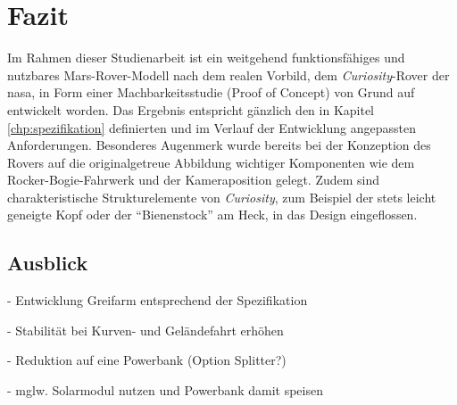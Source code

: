 \chapter{Fazit}
\label{chp:fazit}

Im Rahmen dieser Studienarbeit ist ein weitgehend funktionsfähiges und nutzbares Mars-Rover-Modell nach dem realen Vorbild, dem \textit{Curiosity}-Rover der \acs{nasa}, in Form einer Machbarkeitsstudie (Proof of Concept) von Grund auf entwickelt worden.
Das Ergebnis entspricht gänzlich den in Kapitel \ref{chp:spezifikation} definierten und im Verlauf der Entwicklung angepassten Anforderungen.
Besonderes Augenmerk wurde bereits bei der Konzeption des Rovers auf die originalgetreue Abbildung wichtiger Komponenten wie dem Rocker-Bogie-Fahrwerk und der Kameraposition gelegt.
Zudem sind charakteristische Strukturelemente von \textit{Curiosity}, zum Beispiel der stets leicht geneigte Kopf oder der \enquote{Bienenstock} am Heck, in das Design eingeflossen.


\section{Ausblick}
\label{sec:ausblick}

- Entwicklung Greifarm entsprechend der Spezifikation

- Stabilität bei Kurven- und Geländefahrt erhöhen

- Reduktion auf eine Powerbank (Option Splitter?)

- mglw. Solarmodul nutzen und Powerbank damit speisen